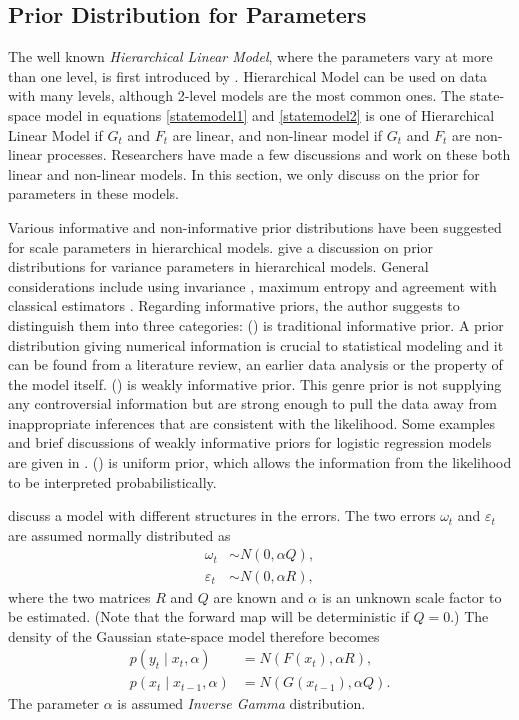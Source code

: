 \subsection{Prior Distribution for Parameters}

The well known \textit{Hierarchical Linear Model}, where the parameters vary at more than one level, is first introduced by \cite{lindley1972bayes, smith1973general}. Hierarchical Model can be used on data with many levels, although 2-level models are the most common ones. The state-space model in equations \eqref{statemodel1} and \eqref{statemodel2} is one of Hierarchical Linear Model if $G_t$ and $F_t$ are linear, and non-linear model if $G_t$ and $F_t$ are non-linear processes. Researchers have made a few discussions and work on these both linear and non-linear models. In this section, we only discuss on the prior for parameters in these models. 

Various informative and non-informative prior distributions have been suggested for scale parameters in hierarchical models. \cite{gelman2006prior} give a discussion on prior distributions for variance parameters in hierarchical models. General considerations include using invariance \citep{jeffries1961theory}, maximum entropy \citep{jaynes1983papers} and agreement with classical estimators \citep{box2011bayesian}. Regarding informative priors, the author suggests to distinguish them into three categories: () is traditional informative prior. A prior distribution giving numerical information is crucial to statistical modeling and it can be found from a literature review, an earlier data analysis or the property of the model itself. () is weakly informative prior. This genre prior is not supplying any controversial information but are strong enough to pull the data away from inappropriate inferences that are consistent with the likelihood. Some examples and brief discussions of weakly informative priors for logistic regression models are given in \citep{gelman2008weakly}. () is uniform prior, which allows the information from the likelihood to be interpreted probabilistically. 

\cite{stroud2007sequential} discuss a model with different structures in the errors. The two errors $\omega_t$ and $\varepsilon_t$ are assumed normally distributed as
\begin{align}
\omega_t &\sim N(0,\alpha Q),\\
\varepsilon_t &\sim N(0,\alpha R),
\end{align}
where the two matrices $R$ and $Q$ are known and $\alpha$ is an unknown scale factor to be estimated. (Note that the forward map will be deterministic if $Q=0$.) The density of the Gaussian state-space model therefore becomes 
\begin{align}
p(y_t\mid x_t,\alpha) &= N(F(x_t),\alpha R),\\
p(x_t\mid x_{t-1},\alpha) &= N(G(x_{t-1}),\alpha Q).
\end{align}
The parameter $\alpha$ is assumed \textit{Inverse Gamma} distribution. 

